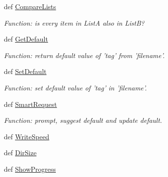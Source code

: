 \begin{DoxyCompactItemize}
def \hyperlink{namespaceutils_ae8afd421a5739ce9f72a2c52fd1a70a2}{\-Compare\-Lists}
\begin{DoxyCompactList}\small\item\em \-Function\-: is every item in \-List\-A also in \-List\-B? \end{DoxyCompactList}\item 
def \hyperlink{namespaceutils_aa33e3686e3ca20a547ded84acc99e6b9}{\-Get\-Default}
\begin{DoxyCompactList}\small\item\em \-Function\-: return default value of 'tag' from 'filename'. \end{DoxyCompactList}\item 
def \hyperlink{namespaceutils_a4d3b9e6523229f8e31ec3c6e3d9de270}{\-Set\-Default}
\begin{DoxyCompactList}\small\item\em \-Function\-: set default value of 'tag' in 'filename'. \end{DoxyCompactList}\item 
def \hyperlink{namespaceutils_aea9a2322958457ae1e080284cd076476}{\-Smart\-Request}
\begin{DoxyCompactList}\small\item\em \-Function\-: prompt, suggest default and update default. \end{DoxyCompactList}\item 
def \hyperlink{namespaceutils_a72d119eb7677d4f971c39b4394016fda}{\-Write\-Speed}
\item 
def \hyperlink{namespaceutils_ab507c4e61b35298818ab9e780188d09a}{\-Dir\-Size}
\item 
def \hyperlink{namespaceutils_a78b63361f871974c1c1b8a85f546952f}{\-Show\-Progress}
\end{DoxyCompactItemize}
